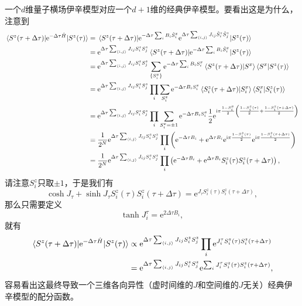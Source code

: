 \documentclass[hyperref, UTF8, a4paper]{ctexart}
\newcommand*{\ii}{\mathrm{i}}
\newcommand*{\ee}{\mathrm{e}}
\newcommand*{\pair}[1]{\langle #1 \rangle}
\begin{document}
一个$d$维量子横场伊辛模型对应一个$d+1$维的经典伊辛模型。要看出这是为什么，注意到
\[
    \begin{aligned}
        \mel{S^z(\tau + \Delta \tau)}{\ee^{-\Delta \tau \hat{H}}}{S^z(\tau)} &= \mel{S^z(\tau + \Delta \tau)}{\ee^{-\Delta \tau \sum_i B_i \hat{S}^x_i} \ee^{\Delta \tau \sum_{\pair{i, j}} J_{ij} \hat{S}_i^z \hat{S}_j^z}}{S^z(\tau)} \\
        &= \ee^{\Delta \tau \sum_{\pair{i, j}} J_{ij} S_i^z S_j^z} \mel{S^z(\tau + \Delta \tau)}{\ee^{-\Delta \tau \sum_i B_i \hat{S}^x_i}}{S^z(\tau)} \\
        &= \ee^{\Delta \tau \sum_{\pair{i, j}} J_{ij} S_i^z S_j^z} \sum_{\{S^x_i\}} \ee^{-\Delta \tau \sum_i B_i S^x_i} \braket{S^z(\tau + \Delta \tau)}{S^x} \braket{S^x}{S^z(\tau)} \\
        &= \ee^{\Delta \tau \sum_{\pair{i, j}} J_{ij} S_i^z S_j^z} \prod_{i} \sum_{S^x_i} \ee^{-\Delta \tau B_i S^x_i} \braket{S^z_i(\tau + \Delta \tau)}{S^x_i} \braket{S^x_i}{S^z_i(\tau)} \\
        &= \ee^{\Delta \tau \sum_{\pair{i, j}} J_{ij} S_i^z S_j^z} \prod_{i} \sum_{S^x_i = \pm 1} \ee^{-\Delta \tau B_i S^x_i} \frac{1}{2} \ee^{\ii \pi \frac{1 - S^x_i}{2} \left( \frac{1 - S^z_i(\tau)}{2} + \frac{1 - S^z_i(\tau + \Delta \tau)}{2} \right)} \\
        &= \frac{1}{2^N} \ee^{\Delta \tau \sum_{\pair{i, j}} J_{ij} S_i^z S_j^z} \prod_i \left( \ee^{- \Delta \tau B_i} + \ee^{\Delta \tau B_i} \ee^{\ii \pi \frac{1 - S^z_i(\tau)}{2}} \ee^{\ii \pi \frac{1 - S^z_i(\tau + \Delta \tau)}{2}} \right) \\
        &= \frac{1}{2^N} \ee^{\Delta \tau \sum_{\pair{i, j}} J_{ij} S_i^z S_j^z} \prod_i \left( \ee^{- \Delta \tau B_i} + \ee^{\Delta \tau B_i} S^z_i(\tau) S^z_i(\tau + \Delta \tau) \right),
    \end{aligned}
\]
请注意$S_i^z$只取$\pm 1$，于是我们有
\[
    \cosh J_\tau + \sinh J_\tau S^z_i(\tau) S^z_i(\tau + \Delta \tau) = \ee^{J_\tau S^z_i(\tau) S^z_i(\tau + \Delta \tau)},
\]
那么只需要定义
\begin{equation}
    \tanh J^\tau_i = \ee^{2 \Delta \tau B_i}, 
\end{equation}
就有
\[
    \begin{aligned}
        \mel{S^z(\tau + \Delta \tau)}{\ee^{-\Delta \tau \hat{H}}}{S^z(\tau)} &\propto \ee^{\Delta \tau \sum_{\pair{i, j}} J_{ij} S_i^z S_j^z} \prod_i \ee^{J_i^\tau S_i^z(\tau) S_i^z(\tau + \Delta \tau)} \\
        &= \ee^{\Delta \tau \sum_{\pair{i, j}} J_{ij} S_i^z S_j^z} \ee^{\sum_i J_i^\tau S_i^z(\tau) S_i^z(\tau + \Delta \tau)},
    \end{aligned}
\]
容易看出这最终导致一个三维各向异性（虚时间维的$J$和空间维的$J$无关）经典伊辛模型的配分函数。
\end{document}
